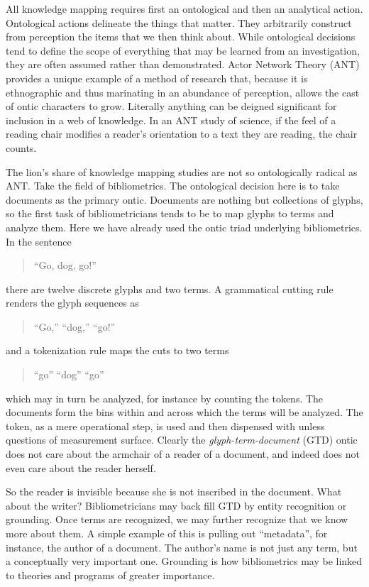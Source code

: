 \documentclass[]{book}
\theoremstyle{definition}
\theoremstyle{definition}
\theoremstyle{definition}
\theoremstyle{remark}
\begin{document}
All knowledge mapping requires first an ontological and then an
analytical action. Ontological actions delineate the things that matter.
They arbitrarily construct from perception the items that we then think
about. While ontological decisions tend to define the scope of
everything that may be learned from an investigation, they are often
assumed rather than demonstrated. Actor Network Theory (ANT) provides a
unique example of a method of research that, because it is ethnographic
and thus marinating in an abundance of perception, allows the cast of
ontic characters to grow. Literally anything can be deigned significant
for inclusion in a web of knowledge. In an ANT study of science, if the
feel of a reading chair modifies a reader's orientation to a text they
are reading, the chair counts.

The lion's share of knowledge mapping studies are not so ontologically
radical as ANT. Take the field of bibliometrics. The ontological
decision here is to take documents as the primary ontic. Documents are
nothing but collections of glyphs, so the first task of bibliometricians
tends to be to map glyphs to terms and analyze them. Here we have
already used the ontic triad underlying bibliometrics. In the sentence

\begin{quote}
``Go, dog, go!''
\end{quote}

there are twelve discrete glyphs and two terms. A grammatical cutting
rule renders the glyph sequences as

\begin{quote}
``Go,'' ``dog,'' ``go!''
\end{quote}

and a tokenization rule maps the cuts to two terms

\begin{quote}
``go'' ``dog'' ``go''
\end{quote}

which may in turn be analyzed, for instance by counting the tokens. The
documents form the bins within and across which the terms will be
analyzed. The token, as a mere operational step, is used and then
dispensed with unless questions of measurement surface. Clearly the
\emph{glyph-term-document} (GTD) ontic does not care about the armchair
of a reader of a document, and indeed does not even care about the
reader herself.

So the reader is invisible because she is not inscribed in the document.
What about the writer? Bibliometricians may back fill GTD by entity
recognition or grounding. Once terms are recognized, we may further
recognize that we know more about them. A simple example of this is
pulling out ``metadata'', for instance, the author of a document. The
author's name is not just any term, but a conceptually very important
one. Grounding is how bibliometrics may be linked to theories and
programs of greater importance.
\end{document}
